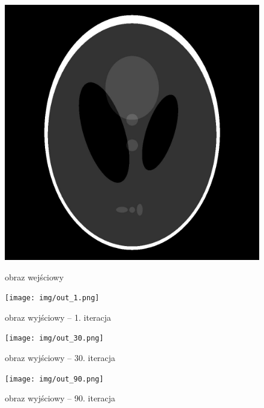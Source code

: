 \documentclass[polish,polish,a4paper]{article}
\begin{document}
					\begin{figure}[!h]
						\centering
						\begin{minipage}{0.45\linewidth}
							\includegraphics[width=\linewidth]{../tomograf-zdjecia/Shepp_logan.jpg} 
							\caption{obraz wejściowy}
						\end{minipage}
						\hfill
						\begin{minipage}{0.45\linewidth}
							\texttt{[image: img/out\_1.png]}
							\caption{obraz wyjściowy -- 1. iteracja}
						\end{minipage}
					\end{figure} 
				
					\begin{figure}[!h]
						\centering
						\begin{minipage}{0.45\linewidth}
							\texttt{[image: img/out\_30.png]}
							\caption{obraz wyjściowy -- 30. iteracja}
						\end{minipage}
						\hfill
						\begin{minipage}{0.45\linewidth}
							\texttt{[image: img/out\_90.png]}
							\caption{obraz wyjściowy -- 90. iteracja}
						\end{minipage}
					\end{figure} 
				
\end{document}
